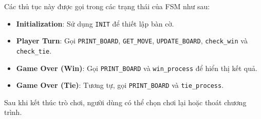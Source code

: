 Các thủ tục này được gọi trong các trạng thái của FSM như sau:
\begin{itemize}
    \item \textbf{Initialization}: Sử dụng \texttt{INIT} để thiết lập bàn cờ.
    \item \textbf{Player Turn}: Gọi \texttt{PRINT\_BOARD}, \texttt{GET\_MOVE}, \texttt{UPDATE\_BOARD}, \texttt{check\_win} và \texttt{check\_tie}.
    \item \textbf{Game Over (Win)}: Gọi \texttt{PRINT\_BOARD} và \texttt{win\_process} để hiển thị kết quả.
    \item \textbf{Game Over (Tie)}: Tương tự, gọi \texttt{PRINT\_BOARD} và \texttt{tie\_process}.
\end{itemize}
Sau khi kết thúc trò chơi, người dùng có thể chọn chơi lại hoặc thoát chương trình.
